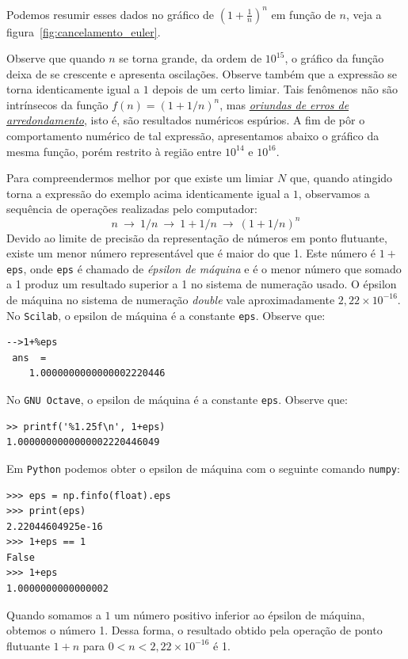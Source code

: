 \begin{ex}
Podemos resumir esses dados no gráfico de $\left(1+\frac{1}{n}\right)^n$ em função de $n$, veja a figura~\ref{fig:cancelamento_euler}.

Observe que quando $n$ se torna grande, da ordem de $10^{15}$, o gráfico da função deixa de se crescente e apresenta oscilações.  Observe também que a expressão se torna identicamente igual a $1$ depois de um certo limiar. Tais fenômenos não são intrínsecos da função $f(n)=(1+1/n)^n$, mas \emph{\uline{oriundas de erros de arredondamento}}, isto é, são resultados numéricos espúrios. A fim de pôr o comportamento numérico de tal expressão, apresentamos abaixo o gráfico da mesma função, porém restrito à região entre $10^{14}$ e $10^{16}$.

Para compreendermos melhor por que existe um limiar $N$ que, quando atingido torna a expressão do exemplo acima identicamente igual a $1$, observamos a sequência de operações realizadas pelo computador:
\begin{equation}\label{seq_oper}
n~\to ~1/n ~\to ~1+1/n ~\to ~(1+1/n)^n
\end{equation}
Devido ao limite de precisão da representação de números em ponto flutuante, existe um menor número representável que é maior do que 1. Este número é $1 + $\verb+eps+, onde \verb+eps+ é chamado de \emph{épsilon de máquina} e é o menor número que somado a 1 produz um resultado superior a 1 no sistema de numeração usado. O épsilon de máquina no sistema de numeração \emph{double} vale aproximadamente $2,22\times 10^{-16}$.
\ifisscilab
No \verb+Scilab+, o epsilon de máquina é a constante \verb+eps+. Observe que:
\begin{verbatim}
-->1+%eps
 ans  =
    1.0000000000000002220446 
\end{verbatim}
\fi
\ifisoctave
No \verb+GNU Octave+, o epsilon de máquina é a constante \verb+eps+. Observe que:
\begin{verbatim}
>> printf('%1.25f\n', 1+eps)
1.0000000000000002220446049
\end{verbatim}
\fi
\ifispython
Em \verb+Python+ podemos obter o epsilon de máquina com o seguinte comando \verb+numpy+:
\begin{verbatim}
>>> eps = np.finfo(float).eps
>>> print(eps)
2.22044604925e-16
>>> 1+eps == 1
False
>>> 1+eps
1.0000000000000002
\end{verbatim}
\fi
Quando somamos a $1$ um número positivo inferior ao épsilon de máquina, obtemos o número 1. Dessa forma, o resultado obtido pela operação de ponto flutuante $1+n$ para $0<n<2,22 \times 10^{-16}$ é 1. 


\end{ex}
